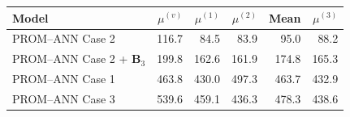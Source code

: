 \begin{tabular}{lrrrr|r}
\toprule
Model & $\mu^{(v)}$ & $\mu^{(1)}$ & $\mu^{(2)}$ & Mean & $\mu^{(3)}$ \\
\midrule
PROM--ANN Case 2 & 116.7 & 84.5 & 83.9 & 95.0 & 88.2 \\
PROM--ANN Case 2 + $\mathbf{B}_3$ & 199.8 & 162.6 & 161.9 & 174.8 & 165.3 \\
PROM--ANN Case 1 & 463.8 & 430.0 & 497.3 & 463.7 & 432.9 \\
PROM--ANN Case 3 & 539.6 & 459.1 & 436.3 & 478.3 & 438.6 \\
\bottomrule
\end{tabular}
